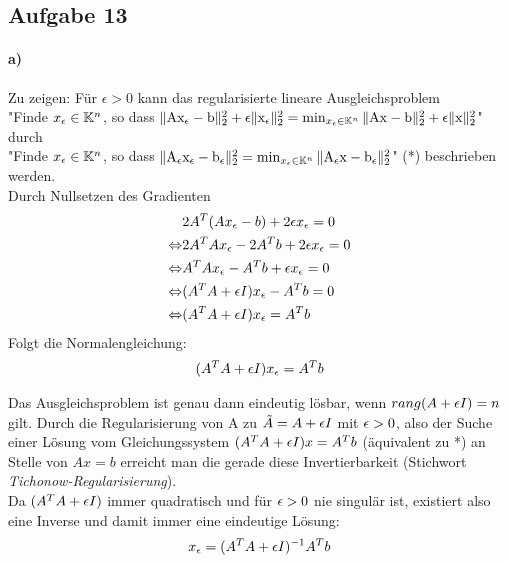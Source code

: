\subsection*{Aufgabe 13}

\paragraph*{a)}
Zu zeigen: Für $\epsilon > 0$ kann das regularisierte lineare Ausgleichsproblem\\
\newline
"Finde $x_\epsilon \in \mathbb K^n$, so dass $\mathrm{\| Ax_\epsilon - b \|_2^2} + \epsilon\mathrm{\| x_\epsilon \|_2^2} = \min_{x_\epsilon \in \mathbb K^n}\mathrm{\| Ax - b \|_2^2} + \epsilon\mathrm{\| x \|_2^2}$"  durch\\
\newline
"Finde $x_\epsilon \in \mathbb K^n$, so dass $\mathrm{\| A_\epsilon x_\epsilon - b_\epsilon \|_2^2} = \min_{x_\epsilon \in \mathbb K^n}\mathrm{\| A_\epsilon x - b_\epsilon \|_2^2}$" (*) beschrieben werden.\\
\newline
Durch Nullsetzen des Gradienten
\begin{align*}
&2A^T(Ax_\epsilon-b)+2\epsilon x_\epsilon = 0\\
\Leftrightarrow &2A^TAx_\epsilon -2A^Tb +2\epsilon x_\epsilon = 0\\
\Leftrightarrow &A^TAx_\epsilon -A^Tb +\epsilon x_\epsilon = 0\\
\Leftrightarrow &(A^TA +\epsilon I)x_\epsilon-A^Tb  = 0\\
\Leftrightarrow &(A^TA +\epsilon I) x_\epsilon = A^Tb\\
\end{align*}
Folgt die Normalengleichung:
\begin{align}(A^TA + \epsilon I)x_\epsilon = A^Tb\label{NGL}\end{align}

Das Ausgleichsproblem ist genau dann eindeutig lösbar, wenn $rang(A+\epsilon I)=n$ gilt.
Durch die Regularisierung von A zu $\tilde{A}= A +\epsilon I$ mit $\epsilon>0$, also der Suche einer Lösung vom Gleichungssystem $(A^TA+\epsilon I)x=A^Tb$ (äquivalent zu *) an Stelle von $Ax=b$ erreicht man die gerade diese Invertierbarkeit (Stichwort \textit{Tichonow-Regularisierung}).\\
Da $(A^TA + \epsilon I)$ immer quadratisch und für $\epsilon > 0$ nie singulär ist, existiert also eine Inverse und damit immer eine eindeutige Lösung:
\begin{align}x_\epsilon = (A^TA + \epsilon I)^{-1}A^Tb\label{xeps}\end{align}


